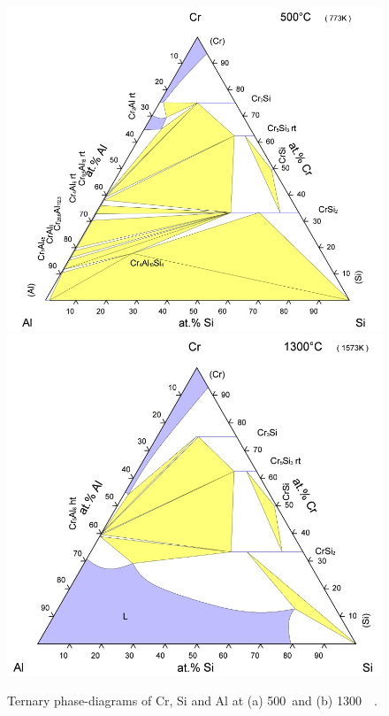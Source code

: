 %
\begin{figure}[htbp]
\begin{center}
\includegraphics[width=12cm]{CrSiAl500}
\includegraphics[width=12cm]{CrSiAl1300}
\caption{Ternary phase-diagrams of Cr, Si and Al at (a) 500\celsius\ and (b) 1300\celsius\ ~\cite{aoki92}.}
\label{fig:CrSiAl}
\end{center}
\end{figure}
%

